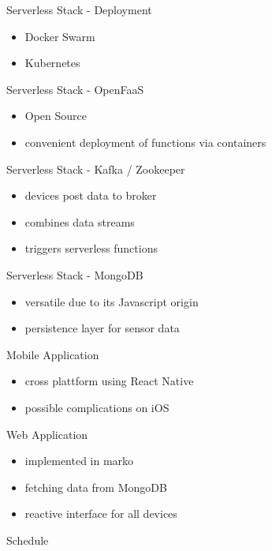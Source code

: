 \documentclass[aspectratio=1610]{beamer}
\begin{document}
  \begin{frame}{Serverless Stack - Deployment}
    \begin{itemize}
      \item Docker Swarm
      \item Kubernetes
    \end{itemize}
  \end{frame}

  \begin{frame}{Serverless Stack - OpenFaaS}
    \begin{itemize}
      \item Open Source
      \item convenient deployment of functions via containers
    \end{itemize}
  \end{frame}

  \begin{frame}{Serverless Stack - Kafka / Zookeeper}
    \begin{itemize}
      \item devices post data to broker
      \item combines data streams
      \item triggers serverless functions
    \end{itemize}
  \end{frame}

  \begin{frame}{Serverless Stack - MongoDB}
    \begin{itemize}
      \item versatile due to its Javascript origin
      \item persistence layer for sensor data
    \end{itemize}
  \end{frame}

  \begin{frame}{Mobile Application}
    \begin{itemize}
      \item cross plattform using React Native
      \item possible complications on iOS
    \end{itemize}
  \end{frame}

  \begin{frame}{Web Application}
    \begin{itemize}
      \item implemented in marko
      \item fetching data from MongoDB
      \item reactive interface for all devices
    \end{itemize}
  \end{frame}

  \begin{frame}{Schedule}

  \end{frame}
\end{document}
